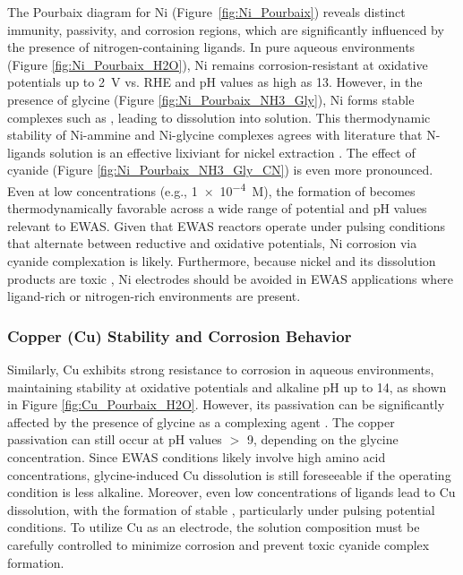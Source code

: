 \documentclass[journal=jacsat,manuscript=article]{achemso}
\begin{document}
The Pourbaix diagram for Ni (Figure~\ref{fig:Ni_Pourbaix}) reveals distinct immunity, passivity, and corrosion regions, which are significantly influenced by the presence of nitrogen-containing ligands. In pure aqueous environments (Figure \ref{fig:Ni_Pourbaix_H2O}), Ni remains corrosion-resistant at oxidative potentials up to 2~V vs. RHE and pH values as high as 13. However, in the presence of glycine (Figure \ref{fig:Ni_Pourbaix_NH3_Gly}), Ni forms stable complexes such as \ce{[Ni(Gly)_3]^{-}}, leading to dissolution into solution. This thermodynamic stability of Ni-ammine and Ni-glycine complexes agrees with literature that N-ligands solution is an effective lixiviant for nickel extraction \cite{Meng1996PrinciplesReview, Yao2021SelectivePhosphide, Ma2021ALeaching}. The effect of cyanide (Figure \ref{fig:Ni_Pourbaix_NH3_Gly_CN}) is even more pronounced. Even at low concentrations (e.g., \num{1e-4}~M), the formation of  becomes thermodynamically favorable across a wide range of potential and pH values relevant to EWAS. Given that EWAS reactors operate under pulsing conditions that alternate between reductive and oxidative potentials, Ni corrosion via cyanide complexation is likely. Furthermore, because nickel and its dissolution products are toxic \cite{Bhattacharya2009CyanideTreatment}, Ni electrodes should be avoided in EWAS applications where ligand-rich or nitrogen-rich environments are present.


\subsubsection{Copper (Cu) Stability and Corrosion Behavior}
Similarly, Cu exhibits strong resistance to corrosion in aqueous environments, maintaining stability at oxidative potentials and alkaline pH up to 14, as shown in Figure \ref{fig:Cu_Pourbaix_H2O}. However, its passivation can be significantly affected by the presence of glycine as a complexing agent \cite{Wang2022ThermodynamicDiagrams,Tripathi2009FundamentalConstituents,Skrypnikova2008PeculiaritiesAdditives,OConnor2018ElectrochemicalSolutions}. The copper passivation can still occur at pH values $>$ 9, depending on the glycine concentration. Since EWAS conditions likely involve high amino acid concentrations, glycine-induced Cu dissolution is still foreseeable if the operating condition is less alkaline. Moreover, even low concentrations of  ligands lead to Cu dissolution, with the formation of stable , particularly under pulsing potential conditions. To utilize Cu as an electrode, the solution composition must be carefully controlled to minimize corrosion and prevent toxic cyanide complex formation.
\end{document}
